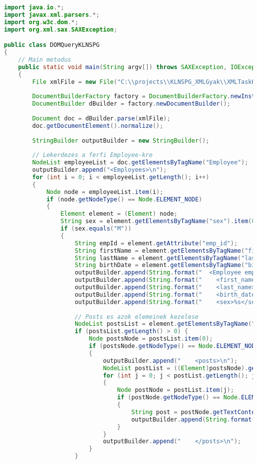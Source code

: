 \documentclass[12pt]{report}
\begin{document}
\begin{lstlisting}[caption={DOMQueryKLNSPG.java} adatlekérdező program, language=Java]
import java.io.*;
import javax.xml.parsers.*;
import org.w3c.dom.*;
import org.xml.sax.SAXException;

public class DOMQueryKLNSPG
{
	// Main metodus
	public static void main(String argv[]) throws SAXException, IOException, ParserConfigurationException 
	{
		File xmlFile = new File("C:\\projects\\KLNSPG_XMLGyak\\XMLTaskKLNSPG\\XMLKLNSPG.xml");
		
		DocumentBuilderFactory factory = DocumentBuilderFactory.newInstance();
		DocumentBuilder dBuilder = factory.newDocumentBuilder();
		
		Document doc = dBuilder.parse(xmlFile);
		doc.getDocumentElement().normalize();
		
		StringBuilder outputBuilder = new StringBuilder();
		
		// Lekerdezes a ferfi Employee-kre
		NodeList employeeList = doc.getElementsByTagName("Employee");
		outputBuilder.append("<Employees>\n");
		for (int i = 0; i < employeeList.getLength(); i++) 
		{
			Node node = employeeList.item(i);
			if (node.getNodeType() == Node.ELEMENT_NODE) 
			{
				Element element = (Element) node;
				String sex = element.getElementsByTagName("sex").item(0).getTextContent();
				if (sex.equals("M")) 
				{
					String empId = element.getAttribute("emp_id");
					String firstName = element.getElementsByTagName("first_name").item(0).getTextContent();
					String lastName = element.getElementsByTagName("last_name").item(0).getTextContent();
					String birthDate = element.getElementsByTagName("birth_date").item(0).getTextContent();
					outputBuilder.append(String.format("  <Employee emp_id=\"%s\">\n", empId));
					outputBuilder.append(String.format("    <first_name>%s</first_name>\n", firstName));
					outputBuilder.append(String.format("    <last_name>%s</last_name>\n", lastName));
					outputBuilder.append(String.format("    <birth_date>%s</birth_date>\n", birthDate));
					outputBuilder.append(String.format("    <sex>%s</sex>\n", sex));
					
					// Posts es azok elemeinek kezelese
					NodeList postsList = element.getElementsByTagName("posts");
					if (postsList.getLength() > 0) {
						Node postsNode = postsList.item(0);
						if (postsNode.getNodeType() == Node.ELEMENT_NODE) 
						{
							outputBuilder.append("    <posts>\n");
							NodeList postList = ((Element)postsNode).getElementsByTagName("post");
							for (int j = 0; j < postList.getLength(); j++) 
							{
								Node postNode = postList.item(j);
								if (postNode.getNodeType() == Node.ELEMENT_NODE) 
								{
									String post = postNode.getTextContent();
									outputBuilder.append(String.format("      <post>%s</post>\n", post));
								}
							}
							outputBuilder.append("    </posts>\n");
						}
					}
					

\end{lstlisting}
\end{document}
